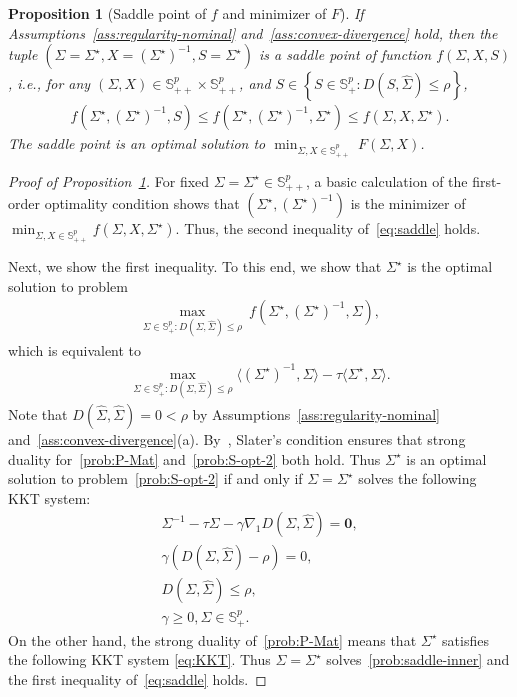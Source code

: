 \documentclass[11pt]{article}
\def\S{\mathbb{S}}
\def\la{\langle}
\def\PSD{{\S^k_{++}}}
\def\ra{\rangle}
\newtheorem{proposition}{Proposition}
\newcommand{\opt}{^\star}
\def\S{\mathbb{S}}
\def\la{\langle}
\def\PSD{{\S^p_{+}}}
\def\PD{{\S^p_{++}}}
\def\ra{\rangle}
\newcommand{\wh}{\widehat}
\begin{document}
\begin{proposition}[Saddle point of $f$ and minimizer of $F$]\label{prop:saddle-point}
    If Assumptions~\ref{ass:regularity-nominal} and~\ref{ass:convex-divergence} hold, then the tuple $(\Sigma = \Sigma\opt, X = (\Sigma\opt)^{-1}, S=\Sigma\opt)$ is a saddle point of function $f(\Sigma, X, S)$, i.e., for any $(\Sigma, X) \in \PD \times \PD$,
    and $S\in \left\{S\in\PSD:D(S, \wh\Sigma)\leq  \rho\right \}$,
    \begin{align}
        \label{eq:saddle}
        f\left(\Sigma\opt, (\Sigma\opt)^{-1}, S\right)
        \leq
        f\left(\Sigma\opt, (\Sigma\opt)^{-1},\Sigma\opt\right)
        \leq f\left(\Sigma,X,\Sigma\opt\right).
    \end{align}
    The saddle point is 
    an optimal solution to $\min_{\Sigma,X \in \PD}~F(\Sigma,X)$.
\end{proposition}

\begin{proof}[Proof of Proposition~\ref{prop:saddle-point}]
For fixed $\Sigma=\Sigma\opt\in \PD$, a basic calculation of the first-order optimality condition shows that 
$(\Sigma\opt,(\Sigma\opt)^{-1})$ 
is the minimizer of $\min_{\Sigma,X\in \PD} f(\Sigma,X,\Sigma\opt)$.
Thus, the second inequality
of~\eqref{eq:saddle} holds.

Next, we show the first inequality. To this end, we show 
that $\Sigma\opt$ is the optimal solution to 
problem 
\begin{align}
\label{prob:saddle-inner}
    \max\limits_{\Sigma \in \PSD: D(\Sigma, \widehat{\Sigma})\leq  \rho}~f(\Sigma\opt,(\Sigma\opt)^{-1},\Sigma),
\end{align}
which is equivalent to 
\begin{align}\label{prob:S-opt-2}
    \max\limits_{\Sigma \in \PSD: D(\Sigma, \widehat{\Sigma})\leq  \rho} \la (\Sigma\opt)^{-1}, \Sigma\ra - \tau \la \Sigma\opt, \Sigma\ra.
\end{align}
Note that $D(\wh\Sigma,\wh\Sigma)=0<\rho$ by Assumptions~\ref{ass:regularity-nominal} and~\ref{ass:convex-divergence}(a). By~\cite[Section 5.2.3]{ref:boyd2004convex}, Slater's condition ensures that strong duality for~\eqref{prob:P-Mat} and~\eqref{prob:S-opt-2} both hold.
Thus $\Sigma\opt$ is an optimal solution to problem~\eqref{prob:S-opt-2} if and only if $\Sigma=\Sigma\opt$ solves the following KKT system:
\begin{equation} \label{eq:KKT}
\begin{array}{r}
    \Sigma^{-1} - \tau \Sigma-\gamma {\nabla_1 D }(\Sigma, \wh \Sigma) = \bm 0, \\
    \gamma(D(\Sigma, \wh \Sigma)- \rho) = 0,\\
    D(\Sigma, \wh\Sigma) \leq  \rho,\\
    \gamma \geq 0, \Sigma \in \PSD. 
\end{array}
\end{equation}
On the other hand, the strong duality of~\eqref{prob:P-Mat} means that $\Sigma\opt$ satisfies the following KKT system \eqref{eq:KKT}. Thus $\Sigma=\Sigma\opt$ solves~\eqref{prob:saddle-inner} and the first inequality of~\eqref{eq:saddle} holds.
\end{proof}
\end{document}

